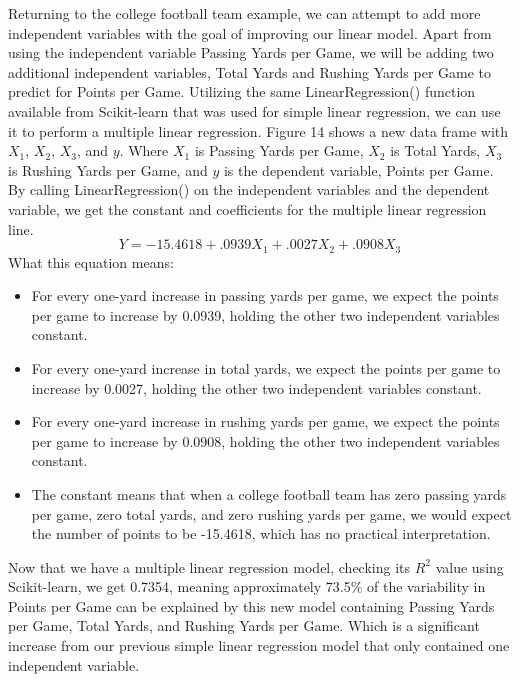 \documentclass[a4paper,12pt]{report}
\begin{document}
Returning to the college football team example, we can attempt to add more independent variables with the goal of improving our linear model. Apart from using the independent variable Passing Yards per Game, we will be adding two additional independent variables, Total Yards and Rushing Yards per Game to predict for Points per Game. Utilizing the same LinearRegression() function available from Scikit-learn that was used for simple linear regression, we can use it to perform a multiple linear regression. Figure 14 shows a new data frame with $X_1$, $X_2$, $X_3$, and $y$. Where $X_1$ is Passing Yards per Game, $X_2$ is Total Yards, $X_3$ is Rushing Yards per Game, and $y$ is the dependent variable, Points per Game. By calling LinearRegression() on the independent variables and the dependent variable, we get the constant and coefficients for the multiple linear regression line.
$$Y=-15.4618+.0939X_1+.0027X_2+.0908X_3$$
What this equation means:
\vspace*{-.9cm}
\begin{itemize}[,]
    \setlength\itemsep{-.1cm}
    \item For every one-yard increase in passing yards per game, we expect the points per game to increase by 0.0939, holding the other two independent variables constant.
    \item For every one-yard increase in total yards, we expect the points per game to increase by 0.0027, holding the other two independent variables constant.
    \item For every one-yard increase in rushing yards per game, we expect the points per game to increase by 0.0908, holding the other two independent variables constant.
    \item The constant means that when a college football team has zero passing yards per game, zero total yards, and zero rushing yards per game, we would expect the number of points to be -15.4618, which has no practical interpretation. 
\end{itemize}

Now that we have a multiple linear regression model, checking its $R^2$ value using Scikit-learn, we get 0.7354, meaning approximately 73.5\% of the variability in Points per Game can be explained by this new model containing Passing Yards per Game, Total Yards, and Rushing Yards per Game. Which is a significant increase from our previous simple linear regression model that only contained one independent variable. 
\end{document}
